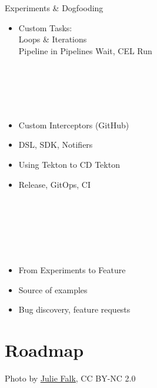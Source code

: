 \documentclass[aspectratio=169,11pt,hyperref={colorlinks=true}]{beamer}
\begin{document}
\begin{2columnsframe}{Experiments \& Dogfooding}%
  {%
  \begin{itemize}
    \item Custom Tasks:\\
          Loops \& Iterations \\
          Pipeline in Pipelines
          Wait, CEL Run
  \end{itemize}
  ~\\
  ~\\
  ~\\
  ~\\
  \begin{itemize}
    \item Custom Interceptors (GitHub)
    \item DSL, SDK, Notifiers
  \end{itemize}
  }{%
  \begin{itemize}
    \item Using Tekton to CD Tekton
    \item Release, GitOps, CI \\~
  \end{itemize}
  ~\\
  ~\\
  ~\\
  ~\\
  \begin{itemize}
    \item From Experiments to Feature
    \item Source of examples
    \item Bug discovery, feature requests
  \end{itemize}
  }
\end{2columnsframe}

\section[Roadmap]{Roadmap}
\begin{sectionwithpicrx}{Photo by \href{https://www.flickr.com/photos/piper/}{\underline{Julie Falk}}, CC BY-NC 2.0}
\end{sectionwithpicrx}
\end{document}
